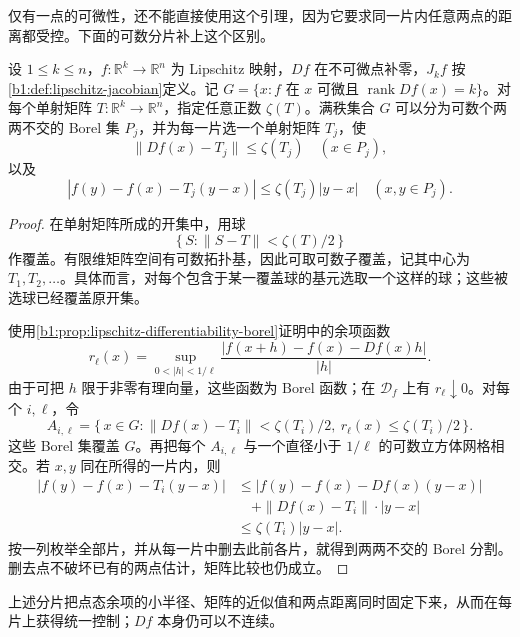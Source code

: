 仅有一点的可微性，还不能直接使用这个引理，因为它要求同一片内任意两点的距离都受控。下面的可数分片补上这个区别。

\begin{lemma}\label{b1:lem:linear-approximation-pieces}
设 \(1\le k\le n\)，\(f:\mathbb R^k\to\mathbb R^n\) 为 Lipschitz 映射，\(Df\) 在不可微点补零，\(J_kf\) 按\cref{b1:def:lipschitz-jacobian}定义。记 \(G=\{x:f\text{ 在 }x\text{ 可微且 }\operatorname{rank}Df(x)=k\}\)。对每个单射矩阵 \(T:\mathbb R^k\rightarrow\mathbb R^n\)，指定任意正数 \(\zeta(T)\)。满秩集合 \(G\) 可以分为可数个两两不交的 Borel 集 \(P_j\)，并为每一片选一个单射矩阵 \(T_j\)，使
\[
 \|Df(x)-T_j\|\leq\zeta(T_j)\quad(x\in P_j),
\]
以及
\[
 |f(y)-f(x)-T_j(y-x)|
 \leq\zeta(T_j)|y-x|\quad(x,y\in P_j).
\]
\end{lemma}
\begin{proof}
在单射矩阵所成的开集中，用球
\[
 \{\,S:\|S-T\|<\zeta(T)/2\,\}
\]
作覆盖。有限维矩阵空间有可数拓扑基，因此可取可数子覆盖，记其中心为 \(T_1,T_2,\ldots\)。具体而言，对每个包含于某一覆盖球的基元选取一个这样的球；这些被选球已经覆盖原开集。

使用\cref{b1:prop:lipschitz-differentiability-borel}证明中的余项函数
\[
 r_\ell(x)=\sup_{0<|h|<1/\ell}
       \frac{|f(x+h)-f(x)-Df(x)h|}{|h|}.
\]
由于可把 \(h\) 限于非零有理向量，这些函数为 Borel 函数；在 \(\mathcal D_f\) 上有 \(r_\ell\downarrow0\)。对每个 \(i,\ell\)，令
\[
 A_{i,\ell}=
 \{\,x\in G:\|Df(x)-T_i\|<\zeta(T_i)/2,\
                      r_\ell(x)\leq\zeta(T_i)/2\,\}.
\]
这些 Borel 集覆盖 \(G\)。再把每个 \(A_{i,\ell}\) 与一个直径小于 \(1/\ell\) 的可数立方体网格相交。若 \(x,y\) 同在所得的一片内，则
\[
 \begin{aligned}
 |f(y)-f(x)-T_i(y-x)|
 &\leq |f(y)-f(x)-Df(x)(y-x)|\\
 &\quad+\|Df(x)-T_i\|\cdot|y-x|\\
 &\leq\zeta(T_i)|y-x|.
 \end{aligned}
\]
按一列枚举全部片，并从每一片中删去此前各片，就得到两两不交的 Borel 分割。删去点不破坏已有的两点估计，矩阵比较也仍成立。
\end{proof}

上述分片把点态余项的小半径、矩阵的近似值和两点距离同时固定下来，从而在每片上获得统一控制；\(Df\) 本身仍可以不连续。

